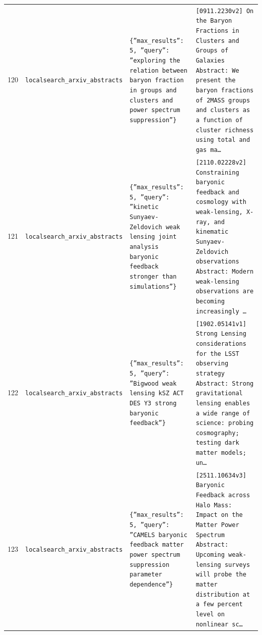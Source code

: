 \documentclass[11pt,a4paper]{article}
\begin{document}
\begin{longtable}{@{}p{}p{}p{}p{}@{}}
120 & \texttt{local}\newline\texttt{search\_\allowbreak{}arxiv\_\allowbreak{}abstracts} & \texttt{\{''max\_\allowbreak{}results'':\allowbreak{} 5,\allowbreak{} ''query'':\allowbreak{} ''exploring the relation between baryon fraction in groups and clusters and power spectrum suppression''\}\allowbreak{}} & \texttt{[0911.2230v2]\allowbreak{} On the Baryon Fractions in Clusters and Groups of Galaxies Abstract:\allowbreak{} We present the baryon fractions of 2MASS groups and clusters as a function of cluster richness using total and gas ma\ldots{}\allowbreak{}} \\
121 & \texttt{local}\newline\texttt{search\_\allowbreak{}arxiv\_\allowbreak{}abstracts} & \texttt{\{''max\_\allowbreak{}results'':\allowbreak{} 5,\allowbreak{} ''query'':\allowbreak{} ''kinetic Sunyaev-Zeldovich weak lensing joint analysis baryonic feedback stronger than simulations''\}\allowbreak{}} & \texttt{[2110.02228v2]\allowbreak{} Constraining baryonic feedback and cosmology with weak-lensing,\allowbreak{} X-ray,\allowbreak{} and kinematic Sunyaev-Zeldovich observations Abstract:\allowbreak{} Modern weak-lensing observations are becoming increasingly \ldots{}\allowbreak{}} \\
122 & \texttt{local}\newline\texttt{search\_\allowbreak{}arxiv\_\allowbreak{}abstracts} & \texttt{\{''max\_\allowbreak{}results'':\allowbreak{} 5,\allowbreak{} ''query'':\allowbreak{} ''Bigwood weak lensing kSZ ACT DES Y3 strong baryonic feedback''\}\allowbreak{}} & \texttt{[1902.05141v1]\allowbreak{} Strong Lensing considerations for the LSST observing strategy Abstract:\allowbreak{} Strong gravitational lensing enables a wide range of science:\allowbreak{} probing cosmography;\allowbreak{} testing dark matter models;\allowbreak{} un\ldots{}\allowbreak{}} \\
123 & \texttt{local}\newline\texttt{search\_\allowbreak{}arxiv\_\allowbreak{}abstracts} & \texttt{\{''max\_\allowbreak{}results'':\allowbreak{} 5,\allowbreak{} ''query'':\allowbreak{} ''CAMELS baryonic feedback matter power spectrum suppression parameter dependence''\}\allowbreak{}} & \texttt{[2511.10634v3]\allowbreak{} Baryonic Feedback across Halo Mass:\allowbreak{} Impact on the Matter Power Spectrum Abstract:\allowbreak{} Upcoming weak-lensing surveys will probe the matter distribution at a few percent level on nonlinear sc\ldots{}\allowbreak{}} \\

\end{longtable}
\end{document}
